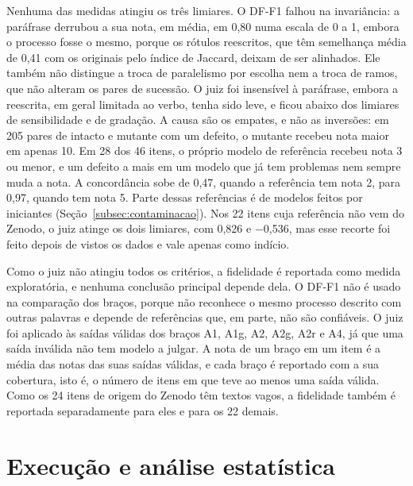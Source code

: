 Nenhuma das medidas atingiu os três limiares. O DF-F1 falhou na invariância: a paráfrase derrubou a sua nota, em média, em 0,80 numa escala de 0 a 1, embora o processo fosse o mesmo, porque os rótulos reescritos, que têm semelhança média de 0,41 com os originais pelo índice de Jaccard, deixam de ser alinhados. Ele também não distingue a troca de paralelismo por escolha nem a troca de ramos, que não alteram os pares de sucessão. O juiz foi insensível à paráfrase, embora a reescrita, em geral limitada ao verbo, tenha sido leve, e ficou abaixo dos limiares de sensibilidade e de gradação. A causa são os empates, e não as inversões: em 205 pares de intacto e mutante com um defeito, o mutante recebeu nota maior em apenas 10. Em 28 dos 46 itens, o próprio modelo de referência recebeu nota 3 ou menor, e um defeito a mais em um modelo que já tem problemas nem sempre muda a nota. A concordância sobe de 0,47, quando a referência tem nota 2, para 0,97, quando tem nota 5. Parte dessas referências é de modelos feitos por iniciantes (Seção~\ref{subsec:contaminacao}). Nos 22 itens cuja referência não vem do Zenodo, o juiz atinge os dois limiares, com 0,826 e $-$0,536, mas esse recorte foi feito depois de vistos os dados e vale apenas como indício.

Como o juiz não atingiu todos os critérios, a fidelidade é reportada como medida exploratória, e nenhuma conclusão principal depende dela. O DF-F1 não é usado na comparação dos braços, porque não reconhece o mesmo processo descrito com outras palavras e depende de referências que, em parte, não são confiáveis. O juiz foi aplicado às saídas válidas dos braços A1, A1g, A2, A2g, A2r e A4, já que uma saída inválida não tem modelo a julgar. A nota de um braço em um item é a média das notas das suas saídas válidas, e cada braço é reportado com a sua cobertura, isto é, o número de itens em que teve ao menos uma saída válida. Como os 24 itens de origem do Zenodo têm textos vagos, a fidelidade também é reportada separadamente para eles e para os 22 demais.

\section{Execução e análise estatística}\label{sec:protocolo}

